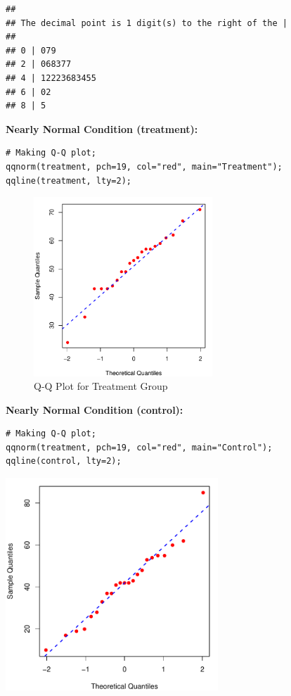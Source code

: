 \begin{example}
\begin{tcolorbox}[colback=gray!10, colframe=black!45, arc=2mm, before skip=4pt, after skip=4pt]
\begin{verbatim}
##
## The decimal point is 1 digit(s) to the right of the |
##
## 0 | 079
## 2 | 068377
## 4 | 12223683455
## 6 | 02
## 8 | 5
\end{verbatim}
\end{tcolorbox}
\noindent\textbf{Nearly Normal Condition (treatment):}
\begin{tcolorbox}[colback=gray!10, colframe=black!45, arc=2mm, before skip=4pt, after skip=4pt]
\begin{verbatim}
# Making Q-Q plot;
qqnorm(treatment, pch=19, col="red", main="Treatment");
qqline(treatment, lty=2);
\end{verbatim}
\end{tcolorbox}
\begin{figure}[H]
\centering
\includegraphics[width=0.6\textwidth]{section14.1/images/treatment_qqplot.pdf}
\caption{Q-Q Plot for Treatment Group}
\label{fig:qqplot-ggplot}
\end{figure}
\noindent\textbf{Nearly Normal Condition (control):}
\begin{tcolorbox}[colback=gray!10, colframe=black!45, arc=2mm, before skip=4pt, after skip=4pt]
\begin{verbatim}
# Making Q-Q plot;
qqnorm(treatment, pch=19, col="red", main="Control");
qqline(control, lty=2);
\end{verbatim}
\end{tcolorbox}
\noindent
\begin{minipage}{\textwidth}
\centering
\includegraphics[width=0.6\textwidth]{section14.1/images/control_qqplot.pdf}

\end{minipage}
\end{example}
